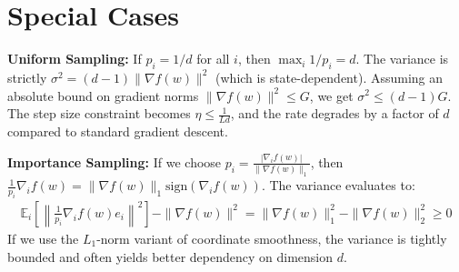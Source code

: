 \documentclass{article}
\begin{document}
\section*{Special Cases}
\textbf{Uniform Sampling:} If $p_i = 1/d$ for all $i$, then $\max_i 1/p_i = d$. The variance is strictly $\sigma^2 = (d-1)\|\nabla f(w)\|^2$ (which is state-dependent). Assuming an absolute bound on gradient norms $\|\nabla f(w)\|^2 \leq G$, we get $\sigma^2 \leq (d-1)G$. The step size constraint becomes $\eta \leq \frac{1}{Ld}$, and the rate degrades by a factor of $d$ compared to standard gradient descent.

\textbf{Importance Sampling:} If we choose $p_i = \frac{|\nabla_i f(w)|}{\|\nabla f(w)\|_1}$, then $\frac{1}{p_i} \nabla_i f(w) = \|\nabla f(w)\|_1 \text{sign}(\nabla_i f(w))$.
The variance evaluates to:
\begin{align*}
    \mathbb{E}_i \left[ \left\| \frac{1}{p_i} \nabla_i f(w) e_i \right\|^2 \right] - \|\nabla f(w)\|^2 = \|\nabla f(w)\|_1^2 - \|\nabla f(w)\|_2^2 \geq 0
\end{align*}
If we use the $L_1$-norm variant of coordinate smoothness, the variance is tightly bounded and often yields better dependency on dimension $d$.
\end{document}
